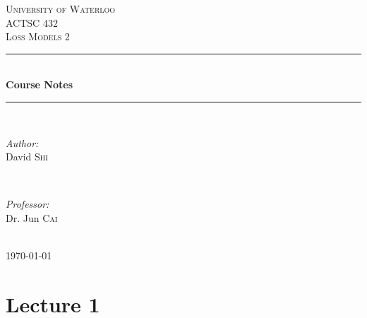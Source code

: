 \documentclass[english,12pt]{article}
\theoremstyle{plain}
\theoremstyle{definition}
\theoremstyle{definition} %
\begin{document}
\begin{titlepage}

\newcommand{\HRule}{\rule{\linewidth}{0.5mm}} %

\center %

\textsc{\LARGE University of Waterloo}\\[1.5cm] %
\textsc{\Large ACTSC 432}\\[0.5cm] %
\textsc{\large Loss Models 2}\\[0.5cm] %

\HRule \\[0.4cm]
{ \huge \bfseries Course Notes}\\[0.4cm] %
\HRule \\[1.5cm]

\begin{minipage}{0.4\textwidth}
\begin{flushleft} \large
\emph{Author:}\\
David \textsc{Shi} %
\end{flushleft}
\end{minipage}
~
\begin{minipage}{0.4\textwidth}
\begin{flushright} \large
\emph{Professor:} \\
Dr. Jun \textsc{Cai} %
\end{flushright}
\end{minipage}\\[4cm]

{\large \today}\\[3cm] %


\vfill %

\end{titlepage}

\tableofcontents %

\newpage


\section*{Lecture 1}
\end{document}

